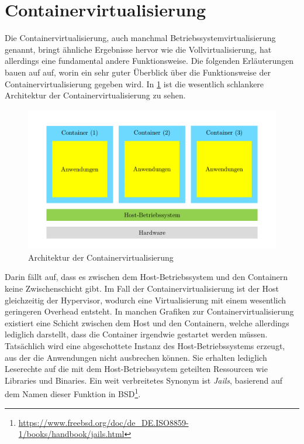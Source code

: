 \section{Containervirtualisierung}
\label{sec:containervirtualisierung}
Die Containervirtualisierung, auch manchmal Betriebssystemvirtualisierung genannt, bringt ähnliche Ergebnisse hervor wie die Vollvirtualisierung, hat allerdings eine fundamental andere Funktionsweise.
Die folgenden Erläuterungen bauen auf \autocite{EntwicklerDE2015} auf, worin ein sehr guter Überblick über die Funktionsweise der Containervirtualisierung gegeben wird.
In \cref{fig:architektur-containervirtualisierung} ist die wesentlich schlankere Architektur der Containervirtualisierung zu sehen.
\begin{figure}[htbp]
    \centering
    \includegraphics[width=0.9\linewidth,clip]{images/containervirtualisierung}
    \caption{Architektur der Containervirtualisierung}
 \label{fig:architektur-containervirtualisierung}
\end{figure}
Darin fällt auf, dass es zwischen dem Host-Betriebssystem und den Containern keine Zwischenschicht gibt.
Im Fall der Containervirtualisierung ist der Host gleichzeitig der Hypervisor, wodurch eine Virtualisierung mit einem wesentlich geringeren Overhead entsteht.
In manchen Grafiken zur Containervirtualisierung existiert eine Schicht zwischen dem Host und den Containern, welche allerdings lediglich darstellt, dass die Container irgendwie gestartet werden müssen.
Tatsächlich wird eine abgeschottete Instanz des Host-Betriebssystems erzeugt, aus der die Anwendungen nicht ausbrechen können.
Sie erhalten lediglich Leserechte auf die mit dem Host-Betriebssystem geteilten Ressourcen wie Libraries und Binaries.
Ein weit verbreitetes Synonym ist \emph{Jails}, basierend auf dem Namen dieser Funktion in BSD\footnote{\url{https://www.freebsd.org/doc/de_DE.ISO8859-1/books/handbook/jails.html}}.

